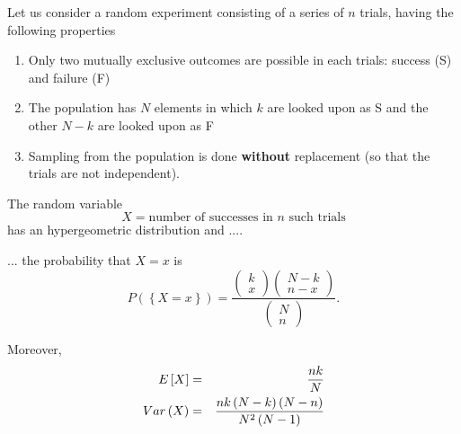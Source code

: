 \documentclass[smaller, handout]{beamer}\usepackage[]{graphicx}\usepackage[]{color}
\renewcommand{\Pr}{P}
\newenvironment{stepenumerate}{\begin{enumerate}[<+->]}{\end{enumerate}}
\begin{document}
\begin{frame}{\secname}

\begin{definition}
Let us consider a random experiment consisting of a series of $n$ trials,
having the following properties

\begin{stepenumerate}
\item Only two mutually exclusive outcomes are possible in each trials:
success (S) and failure (F)

\item The population has $N$ elements in which $k$ are looked upon as
S and the other $N-k$ are looked upon as F

\item Sampling from the population is done \textbf{without} replacement (so
that the trials are not independent).
\end{stepenumerate}
The random variable
$$
X= \text{number of successes in $n$ such
trials}
$$
has an hypergeometric distribution and ....
\end{definition}

\end{frame}%

\begin{frame}{\secname}%


\begin{definition}[cont'd]
... the probability that $X=x$ is
\begin{equation*}
\Pr (\left\{ X=x\right\}) =\frac{\left(
\begin{array}{c}
k \\
x%
\end{array}%
\right) \left(
\begin{array}{c}
N-k \\
n-x%
\end{array}%
\right) }{\left(
\begin{array}{c}
N \\
n%
\end{array}%
\right) }.
\end{equation*}
\end{definition}

Moreover,
\begin{eqnarray*}
E\left[ X\right] &=&\frac{nk}{N} \\
Var\left( X\right) &=&\frac{nk\left( N-k\right) \left( N-n\right) }{%
N^{2}\left( N-1\right) }
\end{eqnarray*}

\end{frame}%
\end{document}
